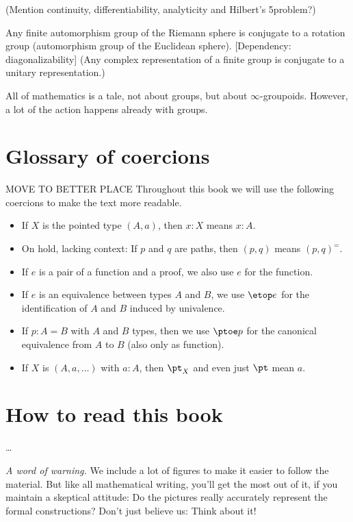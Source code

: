 (Mention continuity, differentiability, analyticity and Hilbert's 5\th problem?)

Any finite automorphism group of the Riemann sphere is conjugate to a
rotation group (automorphism group of the Euclidean sphere).
[Dependency: diagonalizability] (Any complex representation of a
finite group is conjugate to a unitary representation.)


All of mathematics is a tale, not about groups,
but about $\infty$-groupoids.
However, a lot of the action happens already with groups.

\newpage

\section*{Glossary of coercions}

MOVE TO BETTER PLACE
Throughout this book we will use the following coercions to make the text more readable.
\begin{itemize}[noitemsep]
\item If $X$ is the pointed type $(A,a)$, then $x:X$ means $x:A$.
\item On hold, lacking context: If $p$ and $q$ are paths, then $(p,q)$ means $(p,q)^=$.
\item If $e$ is a pair of a function and a proof, we also use $e$ for the function.
\item If $e$ is an equivalence between types $A$ and $B$, we use $\etop e$ for the
identification of $A$ and $B$ induced by univalence.
\item If $p: A= B$ with $A$ and $B$ types, then we use $\ptoe p$ for the canonical
equivalence from $A$ to $B$ (also only as function).
\item If $X$ is $(A,a,\ldots)$ with $a:A$, then $\pt_X$ and even just $\pt$ mean $a$.
\end{itemize}

\bigskip

\section*{How to read this book}

\ldots

\noindent\emph{A word of warning.}\enspace
We include a lot of figures to make it easier to follow the material.
But like all mathematical writing, you'll get the most out of it,
if you maintain a skeptical attitude:
Do the pictures really accurately represent the formal constructions?
Don't just believe us: Think about it!

